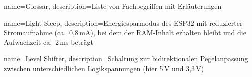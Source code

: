 {
	name=Glossar,
	description={Liste von Fachbegriffen mit Erläuterungen}
}

{
	name=Light Sleep,
	description={Energiesparmodus des ESP32 mit reduzierter Stromaufnahme (ca.\ 0,8\,mA), bei dem der RAM-Inhalt erhalten bleibt und die Aufwachzeit ca.\ 2\,ms beträgt}
}

{
	name=Level Shifter,
	description={Schaltung zur bidirektionalen Pegelanpassung zwischen unterschiedlichen Logikspannungen (hier 5\,V und 3,3\,V)}
}
